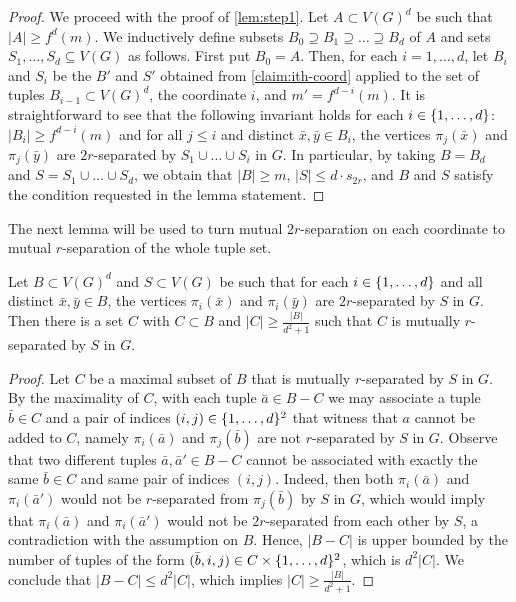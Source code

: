 \begin{proof}
We proceed with the proof of \cref{lem:step1}.
Let $A\subset V(G)^d$ be such that $|A|\ge f^d(m)$.
We inductively define subsets $B_0\supseteq B_1\supseteq \ldots \supseteq B_d$ of $A$ and sets $S_1,\ldots,S_d\subseteq V(G)$ as follows.
First put $B_0=A$. Then, for each $i=1,\ldots,d$,
let $B_{i}$ and $S_i$ be the $B'$ and $S'$ obtained from \cref{claim:ith-coord} applied to the set of tuples $B_{i-1}\subset V(G)^d$, the coordinate $i$, and $m'=f^{d-i}(m)$. 
It is straightforward to see that the following invariant holds for each $i\in \{1,\ldots,d\}$: $|B_i|\ge f^{d-i}(m)$ and for all $j\leq i$
and distinct $\bar x,\bar y\in B_i$, the vertices $\pi_j(\bar x)$ and $\pi_j(\bar{y})$ are $2r$-separated by $S_1\cup\ldots\cup S_i$ in $G$.
In particular, by taking $B=B_d$ and $S=S_1\cup\ldots \cup S_d$, we obtain that $|B|\ge m$, $|S|\le d\cdot s_{2r}$, and $B$ and $S$ satisfy the condition requested in the lemma statement.
\end{proof}

The next lemma will be used to turn mutual $2r$-separation on each coordinate to mutual $r$-separation of the whole tuple set.

\begin{lemma}\label{lem:step2}
	Let $B\subset V(G)^d$ and $S\subset V(G)$ be such that 
   for each $i\in \{1,\ldots,d\}$ and all distinct $\bar{x},\bar{y}\in B$, the vertices $\pi_i(\bar{x})$ and $\pi_i(\bar{y})$ are $2r$-separated by $S$ in $G$.
	Then there is a set $C$ with $C\subset B$ and $|C|\geq\frac{|B|}{d^2+1}$
	such that $C$ is mutually $r$-separated by $S$ in $G$.
\end{lemma}
\begin{proof}
Let $C$ be a maximal subset of $B$ that is mutually $r$-separated by $S$ in $G$.
By the maximality of $C$, with each tuple $\bar a\in B-C$ we may associate a tuple $\bar b\in C$ and a pair of indices $(i,j)\in \{1,\ldots,d\}^2$ that witness that $a$ cannot be added to $C$, namely
$\pi_i(\bar a)$ and $\pi_j(\bar b)$ are not $r$-separated by $S$ in $G$.
Observe that two different tuples $\bar a,\bar a'\in B-C$ cannot be associated with exactly the same $\bar b\in C$ and same pair of indices $(i,j)$.
Indeed, then both $\pi_i(\bar a)$ and $\pi_i(\bar a')$ would not be $r$-separated from $\pi_j(\bar b)$ by $S$ in $G$, 
which would imply that $\pi_i(\bar a)$ and $\pi_i(\bar a')$ would not be $2r$-separated from each other by $S$,
a contradiction with the assumption on $B$.
Hence, $|B-C|$ is upper bounded by the number of tuples of the form $(\bar b,i,j)\in C\times \{1,\ldots,d\}^2$, which is $d^2|C|$.
We conclude that $|B-C|\leq d^2|C|$, which implies $|C|\geq \frac{|B|}{d^2+1}$.
\end{proof}

